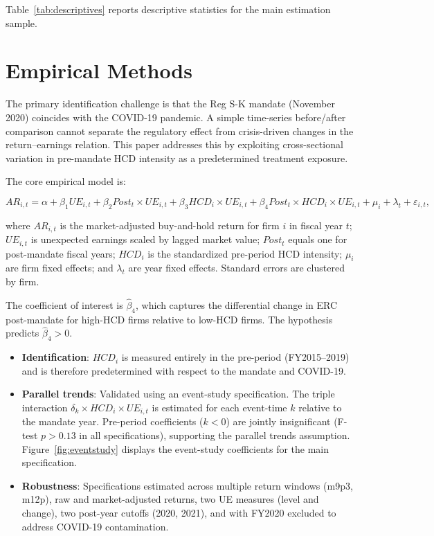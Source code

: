 \documentclass[12pt,english]{article}
\begin{document}
Table~\ref{tab:descriptives} reports descriptive statistics for the main
estimation sample.


\section{Empirical Methods}\label{sec:methods}

The primary identification challenge is that the Reg S-K mandate (November
2020) coincides with the COVID-19 pandemic. A simple time-series before/after
comparison cannot separate the regulatory effect from crisis-driven changes in
the return--earnings relation. This paper addresses this by exploiting
cross-sectional variation in pre-mandate HCD intensity as a predetermined
treatment exposure.

The core empirical model is:

\begin{equation}
\label{eq:main}
AR_{i,t} = \alpha + \beta_1 UE_{i,t} + \beta_2 Post_t \times UE_{i,t}
           + \beta_3 HCD_i \times UE_{i,t}
           + \beta_4 Post_t \times HCD_i \times UE_{i,t}
           + \mu_i + \lambda_t + \varepsilon_{i,t},
\end{equation}

where $AR_{i,t}$ is the market-adjusted buy-and-hold return for firm $i$ in
fiscal year $t$; $UE_{i,t}$ is unexpected earnings scaled by lagged market
value; $Post_t$ equals one for post-mandate fiscal years; $HCD_i$ is the
standardized pre-period HCD intensity; $\mu_i$ are firm fixed effects; and
$\lambda_t$ are year fixed effects. Standard errors are clustered by firm.

The coefficient of interest is $\hat{\beta}_4$, which captures the
differential change in ERC post-mandate for high-HCD firms relative to
low-HCD firms. The hypothesis predicts $\hat{\beta}_4 > 0$.

\begin{itemize}
    \item \textbf{Identification}: $HCD_i$ is measured entirely in the
          pre-period (FY2015--2019) and is therefore predetermined with
          respect to the mandate and COVID-19.
    \item \textbf{Parallel trends}: Validated using an event-study
          specification. The triple interaction $\delta_k \times HCD_i
          \times UE_{i,t}$ is estimated for each event-time $k$ relative to
          the mandate year. Pre-period coefficients ($k < 0$) are jointly
          insignificant (F-test $p > 0.13$ in all specifications), supporting
          the parallel trends assumption. Figure~\ref{fig:eventstudy} displays
          the event-study coefficients for the main specification.
    \item \textbf{Robustness}: Specifications estimated across multiple return
          windows (m9p3, m12p), raw and market-adjusted returns, two UE
          measures (level and change), two post-year cutoffs (2020, 2021),
          and with FY2020 excluded to address COVID-19 contamination.
\end{itemize}
\end{document}
